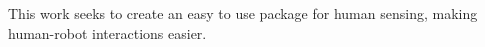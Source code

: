 This work seeks to create an easy to use package for human sensing, making human-robot interactions easier.

